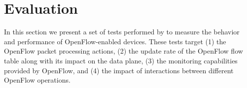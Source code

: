 %


\section{Evaluation}
\label{sec:results}

In this section we present a set of tests performed by \oflops to
measure the behavior and performance of OpenFlow-enabled
devices. These tests target (1) the OpenFlow packet processing 
actions, (2) the update rate of the OpenFlow flow table along with 
its impact on the data plane, (3) the monitoring capabilities provided 
by OpenFlow, and (4) the impact of interactions between different 
OpenFlow operations.

